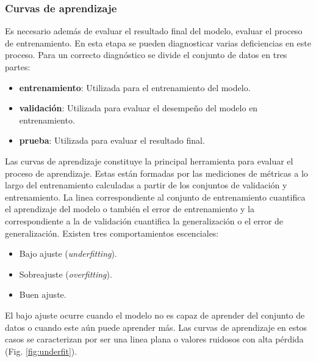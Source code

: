 \subsubsection{Curvas de aprendizaje}

Es necesario además de evaluar el resultado final del modelo, evaluar el proceso de entrenamiento. En esta etapa 
se pueden diagnosticar varias deficiencias en este proceso. Para un correcto diagnóstico se divide el conjunto de 
datos en tres partes:

\begin{itemize}
	\item \textbf{entrenamiento}: Utilizada para el entrenamiento del modelo.
	\item \textbf{validación}: Utilizada para evaluar el desempeño del modelo en entrenamiento.
	\item \textbf{prueba}: Utilizada para evaluar el resultado final.
\end{itemize}

Las curvas de aprendizaje constituye la principal herramienta para evaluar el proceso de aprendizaje.
Estas están formadas por las mediciones de métricas a lo largo del entrenamiento calculadas a partir de 
los conjuntos de validación y entrenamiento. La linea correspondiente al conjunto de entrenamiento cuantifica 
el aprendizaje del modelo o también el error de entrenamiento y la correspondiente a la de validación cuantifica 
la generalización o el error de generalización. Existen tres comportamientos escenciales:

\begin{itemize}
	\item Bajo ajuste (\emph{underfitting}).
	\item Sobreajuste (\emph{overfitting}).
	\item Buen ajuste.
\end{itemize}

El bajo ajuste ocurre cuando el modelo no es capaz de aprender del conjunto de datos o cuando este aún puede aprender 
más. Las curvas de aprendizaje en estos casos se caracterizan por ser una linea plana o valores ruidosos con alta pérdida
(Fig. \ref{fig:underfit}).


